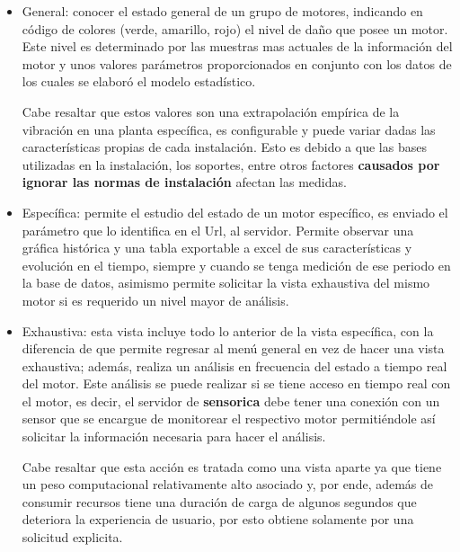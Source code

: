 \begin{itemize}
    \item General: conocer el estado general de un grupo de motores, indicando
        en código de colores (verde, amarillo, rojo) el nivel de daño que posee
        un motor. Este nivel es determinado por las muestras mas actuales de
        la información del motor y unos valores parámetros proporcionados en
        conjunto con los datos de los cuales se elaboró el modelo estadístico.

        Cabe resaltar que estos valores son una extrapolación empírica de la
        vibración en una planta específica, es configurable y puede variar dadas
        las características propias de cada instalación. Esto es debido a que
        las bases utilizadas en la instalación, los soportes, entre otros factores
        \textbf{causados por ignorar las normas de instalación} afectan las medidas.

    \item Específica:  permite el estudio del estado de un motor específico,
        es enviado el parámetro que lo identifica en el Url, al servidor.
        Permite observar
        una gráfica histórica y una tabla exportable a excel de sus características y
        evolución en el tiempo, siempre y cuando se tenga medición de ese periodo
        en la base de datos, asimismo permite solicitar la vista exhaustiva del
        mismo motor si es requerido un nivel mayor de análisis.

    \item Exhaustiva: esta vista incluye todo lo anterior de la vista específica,
        con la diferencia de que permite regresar al menú general en vez de hacer
        una vista exhaustiva; además, realiza un análisis en frecuencia
        del estado a tiempo real del motor. Este análisis se puede realizar si
        se tiene acceso en tiempo real con el motor, es decir,
        el servidor de \textbf{sensorica} debe tener una conexión con un sensor que se
        encargue de monitorear el respectivo motor permitiéndole así solicitar
        la información necesaria para hacer el análisis.

        Cabe resaltar que esta acción es tratada como una vista aparte ya que
        tiene un peso computacional relativamente alto asociado y, por ende,
        además de consumir recursos tiene una duración de carga de algunos
        segundos que deteriora la experiencia de usuario, por esto
        obtiene solamente por una solicitud explicita.
\end{itemize}





